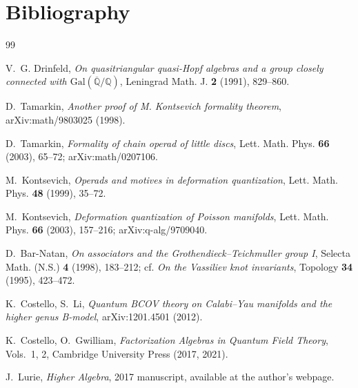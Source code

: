 \documentclass[11pt]{amsart}
\theoremstyle{plain}
\theoremstyle{definition}
\theoremstyle{remark}
\providecommand{\Q}{\mathbb{Q}}
\begin{document}
\section*{Bibliography}

\begin{thebibliography}{99}

V.~G. Drinfeld,
\emph{On quasitriangular quasi-Hopf algebras and a group closely connected with $\mathrm{Gal}(\overline{\Q}/\Q)$},
Leningrad Math. J. \textbf{2} (1991), 829--860.

D.~Tamarkin,
\emph{Another proof of M. Kontsevich formality theorem},
arXiv:math/9803025 (1998).

D.~Tamarkin,
\emph{Formality of chain operad of little discs},
Lett. Math. Phys. \textbf{66} (2003), 65--72; arXiv:math/0207106.

M.~Kontsevich,
\emph{Operads and motives in deformation quantization},
Lett. Math. Phys. \textbf{48} (1999), 35--72.

M.~Kontsevich,
\emph{Deformation quantization of Poisson manifolds},
Lett. Math. Phys. \textbf{66} (2003), 157--216; arXiv:q-alg/9709040.

D.~Bar-Natan,
\emph{On associators and the Grothendieck--Teichmuller group I},
Selecta Math. (N.S.) \textbf{4} (1998), 183--212; cf. \emph{On the Vassiliev knot invariants}, Topology \textbf{34} (1995), 423--472.

K.~Costello, S.~Li,
\emph{Quantum BCOV theory on Calabi--Yau manifolds and the higher genus B-model},
arXiv:1201.4501 (2012).

K.~Costello, O.~Gwilliam,
\emph{Factorization Algebras in Quantum Field Theory},
Vols.~1, 2, Cambridge University Press (2017, 2021).

J.~Lurie,
\emph{Higher Algebra},
2017 manuscript, available at the author's webpage.

\end{thebibliography}
\end{document}
